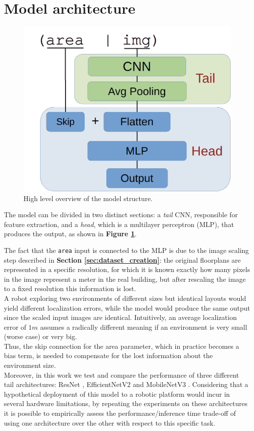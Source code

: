 
\section{Model architecture} %
\begin{figure}[htb!]
    \centering
    \includegraphics[width=0.55\linewidth]{images/cnnStruct.png}
    \caption{High level overview of the model structure.}
    \label{fig:cnn_arch}
\end{figure}

\noindent
The model can be divided in two distinct sections: a \textit{tail} CNN, responsible for feature extraction, and a \textit{head}, which is a multilayer perceptron (MLP), that produces the output, as shown in \textbf{Figure \ref{fig:cnn_arch}}. 

The fact that the \texttt{area} input is connected to the MLP is due to the image scaling step described in \textbf{Section \ref{sec:dataset_creation}}: the original floorplans are represented in a specific resolution, for which it is known exactly how many pixels in the image represent a meter in the real building, but after rescaling the image to a fixed resolution this information is lost. \\
A robot exploring two environments of different sizes but identical layouts would yield different localization errors, while the model would produce the same output since the scaled input images are identical. Intuitively, an average localization error of $1m$ assumes a radically different meaning if an environment is very small (worse case) or very big. \\
Thus, the skip connection for the area parameter, which in practice becomes a bias term, is needed to compensate for the lost information about the environment size. \\

\noindent
Moreover, in this work we test and compare the performance of three different tail architectures: ResNet \cite{resnet2016}, EfficientNetV2 \cite{efficientnet} and MobileNetV3 \cite{mobileNetV3_2019}. Considering that a hypothetical deployment of this model to a robotic platform would incur in several hardware limitations, by repeating the experiments on these architectures it is possible to empirically assess the performance/inference time trade-off of using one architecture over the other with respect to this specific task. 

